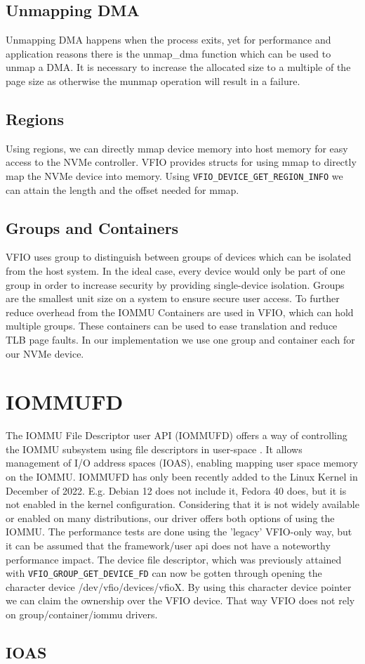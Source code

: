 \subsection{Unmapping DMA}
Unmapping DMA happens when the process exits, yet for performance and application reasons there is the unmap\_dma function which can be used to unmap a DMA. It is necessary to increase the allocated size to a multiple of the page size as otherwise the munmap operation will result in a failure.

\subsection{Regions}
Using regions, we can directly mmap device memory into host memory for easy access to the NVMe controller.
VFIO provides structs for using mmap to directly map the NVMe device into memory. Using \texttt{VFIO\_DEVICE\_GET\_REGION\_INFO} we can attain the length and the offset needed for mmap.

\subsection{Groups and Containers}
VFIO uses group to distinguish between groups of devices which can be isolated from the host system. In the ideal case, every device would only be part of one group in order to increase security by providing single-device isolation. Groups are the smallest unit size on a system to ensure secure user access.
To further reduce overhead from the IOMMU Containers are used in VFIO, which can hold multiple groups. These containers can be used to ease translation and reduce TLB page faults.
In our implementation we use one group and container each for our NVMe device.

\section{IOMMUFD}
The IOMMU File Descriptor user API (IOMMUFD) offers a way of controlling the IOMMU subsystem using file descriptors in user-space \cite{iommufdkerneldocs}.
It allows management of I/O address spaces (IOAS), enabling mapping user space memory on the IOMMU.
IOMMUFD has only been recently added to the Linux Kernel in December of 2022. E.g. Debian 12 does not include it, Fedora 40 does, but it is not enabled in the kernel configuration. Considering that it is not widely available or enabled on many distributions, our driver offers both options of using the IOMMU. The performance tests are done using the 'legacy' VFIO-only way, but it can be assumed that the framework/user api does not have a noteworthy performance impact.
The device file descriptor, which was previously attained with \texttt{VFIO\_GROUP\_GET\_DEVICE\_FD} can now be gotten through opening the character device /dev/vfio/devices/vfioX.
By using this character device pointer we can claim the ownership over the VFIO device. That way VFIO does not rely on group/container/iommu drivers.

\subsection{IOAS}
